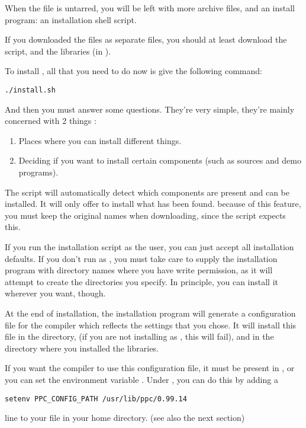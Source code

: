 \documentclass{book}
\begin{document}
When the file is untarred, you will be left with more archive files, and
an install program: an installation shell script.

If you downloaded the files as separate files, you should at least download
the  script, and the libraries (in ).

To install \fpc, all that you need to do now is give the following command:
\begin{verbatim}
./install.sh
\end{verbatim}
And then you must answer some questions. They're very simple, they're
mainly concerned with 2 things :
\begin{enumerate}
\item Places where you can install different things.
\item Deciding if you want to install certain components (such as sources
and demo programs).
\end{enumerate}
The script will automatically detect which components are present and can be
installed. It will only offer to install what has been found.
because of this feature, you must keep the original names when downloading,
since the script expects this.

If you run the installation script as the  user, you can just accept all installation
defaults. If you don't run as , you must take care to supply the
installation program with directory names where you have write permission,
as it will attempt to create the directories you specify.
In principle, you can install it wherever you want, though.

At the end of installation, the installation program will generate a
configuration file for the \fpc compiler which reflects the settings
that you chose. It will install this file in the  directory, (if
you are not installing as , this will fail), and in the
directory where you installed the libraries.

If you want the \fpc compiler to use this configuration file, it must be
present in , or you can set the environment variable
. Under , you can do this by adding  a
\begin{verbatim}
setenv PPC_CONFIG_PATH /usr/lib/ppc/0.99.14
\end{verbatim}
line to your  file in your home directory.
(see also the next section)
\end{document}
